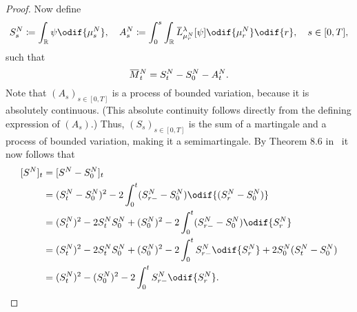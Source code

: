 \begin{proof}
  Now define
  \begin{equation}
    S_s^N \coloneqq \int_\potspace \psi \odif{\mu_s^N},
    \quad
    A_s^N \coloneqq \int_0^s \int_\potspace \ol{L}_{\mu_r^N}^{\lambda} [\psi] \odif{\mu_{r}^N} \odif{r}, \quad s \in [0,T],
  \end{equation}
  such that
  \begin{equation}\label{eq:M=S-A}
    \ol{M}_t^N = S_t^N - S_0^N - A_t^N.
  \end{equation}
  Note that \((A_s)_{s\in[0,T]}\) is a process of bounded variation, because it is absolutely continuous. %
  (This absolute continuity follows directly from the defining expression of \((A_s)\).) %
  Thus, \((S_s)_{s\in[0,T]}\) is the sum of a martingale and a process of bounded variation, making it a semimartingale.
  By Theorem 8.6 in~\cite[221]{klebanerIntroductionStochasticCalculus2012} it now follows that
  \begin{equation}\label{eq:S^2-q-var-rel}
    \begin{split}
      \sbr{S^N}_t & = \sbr{S^N - S_0^N}_t                                                                                \\   %
                  & = (S_t^N - S_0^N)^2 - 2 \int_0^t (S_{r-}^N - S_0^N) \odif{\br{S_r^N - S_0^N}}                        \\
                  & = (S_t^N)^2 - 2 S_t^N S_0^N + (S_0^N)^2 - 2 \int_0^t (S_{r-}^N - S_0^N) \odif{S_r^N}                 \\   %
                  & = (S_t^N)^2 - 2 S_t^N S_0^N + (S_0^N)^2 - 2 \int_0^t S_{r-}^N \odif{S_r^N} + 2 S_0^N (S_t^N - S_0^N) \\
                  & = (S_t^N)^2 - (S_0^N)^2 - 2 \int_0^t S_{r-}^N \odif{S_r^N}.
    \end{split}
  \end{equation}


\end{proof}
